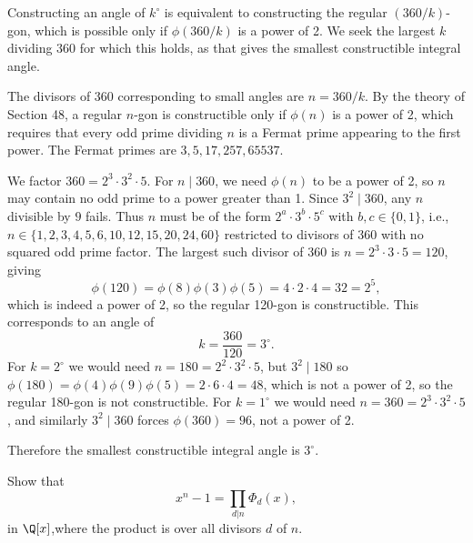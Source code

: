 \begin{solution}
  Constructing an angle of $k^\circ$ is equivalent to constructing the regular $(360/k)$-gon, which is possible only if $\phi(360/k)$ is a power of 2. We seek the largest $k$ dividing 360 for which this holds, as that gives the smallest constructible integral angle.

  The divisors of 360 corresponding to small angles are $n = 360/k$. By the theory of Section 48, a regular $n$-gon is constructible only if $\phi(n)$ is a power of 2, which requires that every odd prime dividing $n$ is a Fermat prime appearing to the first power. The Fermat primes are $3, 5, 17, 257, 65537$.

  We factor $360 = 2^3 \cdot 3^2 \cdot 5$. For $n \mid 360$, we need $\phi(n)$ to be a power of 2, so $n$ may contain no odd prime to a power greater than 1. Since $3^2 \mid 360$, any $n$ divisible by $9$ fails. Thus $n$ must be of the form $2^a \cdot 3^b \cdot 5^c$ with $b, c \in \{0,1\}$, i.e., $n \in \{1, 2, 3, 4, 5, 6, 10, 12, 15, 20, 24, 60\}$ restricted to divisors of 360 with no squared odd prime factor. The largest such divisor of 360 is $n = 2^3 \cdot 3 \cdot 5 = 120$, giving
  \[%
    \phi(120) = \phi(8)\phi(3)\phi(5) = 4 \cdot 2 \cdot 4 = 32 = 2^5,
  \]%
  which is indeed a power of 2, so the regular 120-gon is constructible. This corresponds to an angle of
  \[%
    k = \frac{360}{120} = 3^\circ.
  \]%
  For $k = 2^\circ$ we would need $n = 180 = 2^2 \cdot 3^2 \cdot 5$, but $3^2 \mid 180$ so $\phi(180) = \phi(4)\phi(9)\phi(5) = 2 \cdot 6 \cdot 4 = 48$, which is not a power of 2, so the regular 180-gon is not constructible. For $k = 1^\circ$ we would need $n = 360 = 2^3 \cdot 3^2 \cdot 5$, and similarly $3^2 \mid 360$ forces $\phi(360) = 96$, not a power of 2.

  Therefore the smallest constructible integral angle is $3^\circ$.
\end{solution}

\begin{problem}[48.8]
  Show that
  \[%
    x^n - 1 = \prod_{d|n} \Phi_d(x)
  ,\]%
  in $\Q[x]$,where the product is over all divisors $d$ of $n$.
\end{problem}

